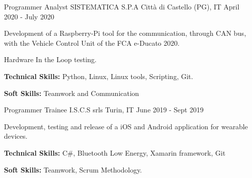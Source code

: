 

\begin{cventries}

  \cventry
    {Programmer Analyst} %
    {SISTEMATICA S.P.A} %
    {Città di Castello (PG), IT} %
    {April 2020 - July 2020} %
    {
      \begin{cvitems} %
        \item {Development of a Raspberry-Pi tool for the communication, through CAN bus, with the Vehicle Control Unit of the FCA e-Ducato 2020.}
        \item {Hardware In the Loop testing.}
        \item {\textbf{Technical Skills:} Python, Linux, Linux tools, Scripting, Git.}
        \item {\textbf{Soft Skills:} Teamwork and Communication}
      \end{cvitems}
    }

  \cventry
    {Programmer Trainee} %
    {I.S.C.S srls} %
    {Turin, IT} %
    {June 2019 - Sept 2019} %
    {
      \begin{cvitems} %
        \item {Development, testing and release of a iOS and Android application for wearable devices.}
        \item {\textbf{Technical Skills:} C\#, Bluetooth Low Energy, Xamarin framework, Git}
        \item {\textbf{Soft Skills:} Teamwork, Scrum Methodology.}
      \end{cvitems}
    }

\end{cventries}

